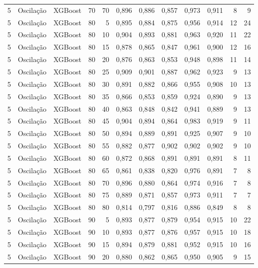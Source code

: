\begin{longtable}{@{}rllrrrrrrrrr@{}}
5 & Oscilação & XGBoost & 70 & 70 & 0,896 & 0,886 & 0,857 & 0,973 & 0,911 & 8 & 9 \\
5 & Oscilação & XGBoost & 80 & 5 & 0,895 & 0,884 & 0,875 & 0,956 & 0,914 & 12 & 24 \\
5 & Oscilação & XGBoost & 80 & 10 & 0,904 & 0,893 & 0,881 & 0,963 & 0,920 & 11 & 22 \\
5 & Oscilação & XGBoost & 80 & 15 & 0,878 & 0,865 & 0,847 & 0,961 & 0,900 & 12 & 16 \\
5 & Oscilação & XGBoost & 80 & 20 & 0,876 & 0,863 & 0,853 & 0,948 & 0,898 & 11 & 14 \\
5 & Oscilação & XGBoost & 80 & 25 & 0,909 & 0,901 & 0,887 & 0,962 & 0,923 & 9 & 13 \\
5 & Oscilação & XGBoost & 80 & 30 & 0,891 & 0,882 & 0,866 & 0,955 & 0,908 & 10 & 13 \\
5 & Oscilação & XGBoost & 80 & 35 & 0,866 & 0,853 & 0,859 & 0,924 & 0,890 & 9 & 13 \\
5 & Oscilação & XGBoost & 80 & 40 & 0,863 & 0,848 & 0,842 & 0,941 & 0,889 & 9 & 13 \\
5 & Oscilação & XGBoost & 80 & 45 & 0,904 & 0,894 & 0,864 & 0,983 & 0,919 & 9 & 11 \\
5 & Oscilação & XGBoost & 80 & 50 & 0,894 & 0,889 & 0,891 & 0,925 & 0,907 & 9 & 10 \\
5 & Oscilação & XGBoost & 80 & 55 & 0,882 & 0,877 & 0,902 & 0,902 & 0,902 & 9 & 10 \\
5 & Oscilação & XGBoost & 80 & 60 & 0,872 & 0,868 & 0,891 & 0,891 & 0,891 & 8 & 11 \\
5 & Oscilação & XGBoost & 80 & 65 & 0,861 & 0,838 & 0,820 & 0,976 & 0,891 & 7 & 8 \\
5 & Oscilação & XGBoost & 80 & 70 & 0,896 & 0,880 & 0,864 & 0,974 & 0,916 & 7 & 8 \\
5 & Oscilação & XGBoost & 80 & 75 & 0,889 & 0,871 & 0,857 & 0,973 & 0,911 & 7 & 7 \\
5 & Oscilação & XGBoost & 80 & 80 & 0,814 & 0,797 & 0,816 & 0,886 & 0,849 & 8 & 8 \\
5 & Oscilação & XGBoost & 90 & 5 & 0,893 & 0,877 & 0,879 & 0,954 & 0,915 & 10 & 22 \\
5 & Oscilação & XGBoost & 90 & 10 & 0,893 & 0,877 & 0,876 & 0,957 & 0,915 & 10 & 18 \\
5 & Oscilação & XGBoost & 90 & 15 & 0,894 & 0,879 & 0,881 & 0,952 & 0,915 & 10 & 16 \\
5 & Oscilação & XGBoost & 90 & 20 & 0,880 & 0,862 & 0,865 & 0,950 & 0,905 & 9 & 15 \\

\end{longtable}
